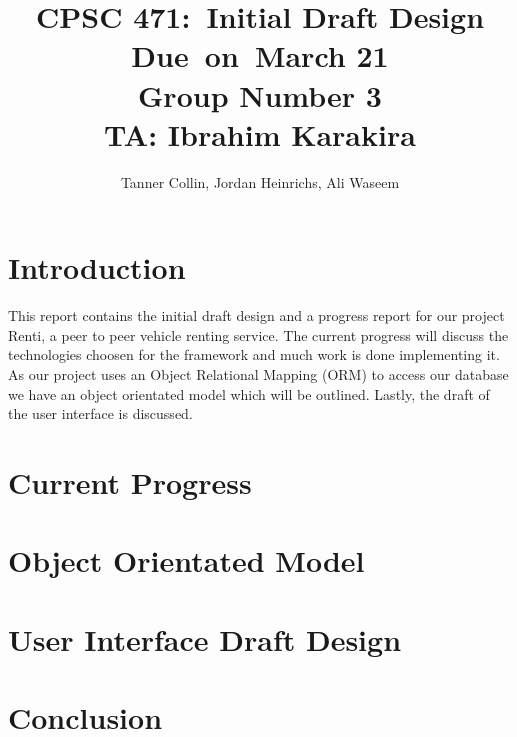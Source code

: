 \documentclass{article}
\title{
\vspace{2in}
\textmd{\textbf{CPSC 471:\ Initial Draft Design}}\\
\normalsize\vspace{0.1in}\small{Due\ on\ March 21 \\ Group Number 3 \\ TA: Ibrahim Karakira}\\
\vspace{3in}
}
\author{Tanner Collin, Jordan Heinrichs, Ali Waseem}
\date{}
\begin{document}
\maketitle
\newpage

\section{Introduction}
This report contains the initial draft design and a progress report for our project Renti, a peer to peer vehicle renting service. The current progress will discuss the
technologies choosen for the framework and much work is done implementing it. As our project uses an Object Relational Mapping (ORM) to access our database we have an
object orientated model which will be outlined. Lastly, the draft of the user interface is discussed. %

\section{Current Progress}

\section{Object Orientated Model}

\section{User Interface Draft Design} %

\section{Conclusion}
\end{document}
